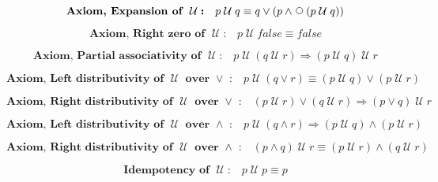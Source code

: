 \documentclass[fleqn, leqno]{article}
\newcommand{\impl}{\ensuremath{\Rightarrow}}        %
\newcommand{\Until}{\;\mathcal{U}\;}
\newcommand{\Next}{\;\,\text{\raisebox{3.5pt}{\circle{6}}}}
\newcommand{\spacer}{\vspace{-30pt}}
\newcommand{\firstspacer}{\vspace{-26pt}}
\begin{document}
\firstspacer

\begin{equation}\label{E:expansionUntil}
\textbf{Axiom, Expansion of $\Until$:}\quad p \Until q \equiv q \lor (p \land \Next (p \Until q))
\end{equation}

\spacer

\begin{equation}\label{E:untilFalse}
\textbf{Axiom, Right zero of $\Until$:}\quad p \Until false \equiv false
\end{equation}

\spacer

\begin{equation}\label{E:untilAssocImp}
\textbf{Axiom, Partial associativity of $\Until$:}\quad p \Until (q \Until r) \impl (p \Until q) \Until r
\end{equation}

\spacer

\begin{equation}\label{E:untilOrEquiv}
\textbf{Axiom, Left distributivity of $\Until$ over $\lor$ :}\quad p \Until (q \lor r) \equiv (p \Until q) \lor (p \Until r)
\end{equation}

\spacer

\begin{equation}\label{E:untilOrImp}
\textbf{Axiom, Right distributivity of $\Until$ over $\lor$ :}\quad (p \Until r) \lor (q \Until r) \impl (p \lor q) \Until r
\end{equation}

\spacer

\begin{equation}\label{E:untilAndImp}
\textbf{Axiom, Left distributivity of $\Until$ over $\land$ :}\quad p \Until (q \land r) \impl (p \Until q) \land (p \Until r)
\end{equation}

\spacer

\begin{equation}\label{E:untilAndEquiv}
\textbf{Axiom, Right distributivity of $\Until$ over $\land$ :}\quad (p \land q) \Until r \equiv (p \Until r) \land (q \Until r)
\end{equation}

\spacer

\begin{equation}\label{E:idemUntil}
\textbf{Idempotency of $\Until$:}\quad p \Until p \equiv p
\end{equation}
\end{document}
